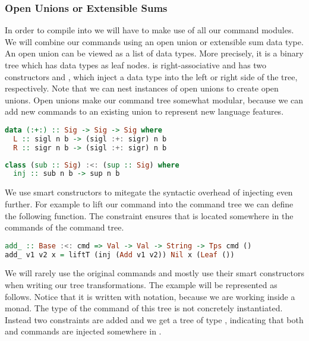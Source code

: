 \subsubsection{\label{subsection:openunion}Open Unions or Extensible Sums}
In order to compile  into  we will have to make use of all our  command modules. We will combine our commands using an open union or extensible sum data type. An open union can be viewed as a list of data types. More precisely, it is a binary tree which has data types as leaf nodes. \icode{:+:} is right-associative and has two constructors  and , which inject a data type into the left or right side of the tree, respectively. Note that we can nest instances of open unions to create open unions. Open unions make our command tree somewhat modular, because we can add new commands to an existing union to represent new language features.

\begin{lstlisting}[language=Haskell]
data (:+:) :: Sig -> Sig -> Sig where
  L :: sigl n b -> (sigl :+: sigr) n b
  R :: sigr n b -> (sigl :+: sigr) n b
\end{lstlisting}

\begin{lstlisting}[language=Haskell]
class (sub :: Sig) :<: (sup :: Sig) where
  inj :: sub n b -> sup n b
\end{lstlisting}

We use smart constructors to mitegate the syntactic overhead of injecting \autocite{DBLP:conf/haskell/WuSH14, DBLP:conf/popl/LiangHJ95} even further. For example to lift our  command into the command tree we can define the following function. The constraint  ensures that  is located somewhere in the commands of the command tree.

\begin{lstlisting}[language=Haskell]
add_ :: Base :<: cmd => Val -> Val -> String -> Tps cmd ()
add_ v1 v2 x = liftT (inj (Add v1 v2)) Nil x (Leaf ())
\end{lstlisting}

We will rarely use the original commands and mostly use their smart constructors when writing our tree transformations. The  example will be represented as follows. Notice that it is written with  notation, because we are working inside a monad. The type of the command of this tree is not concretely instantiated. Instead two constraints are added and we get a tree of type , indicating that both  and  commands are injected somewhere in .

